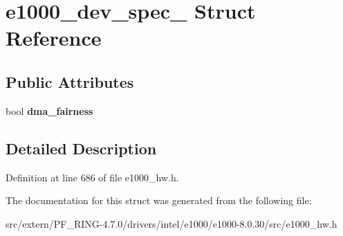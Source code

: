 \hypertarget{structe1000__dev__spec__82542}{
\section{e1000\_\-dev\_\-spec\_ Struct Reference}
\label{structe1000__dev__spec__82542}
}
\subsection*{Public Attributes}
\begin{DoxyCompactItemize}
\item 
\hypertarget{structe1000__dev__spec__82542_ad681841cc28b4e8b96f283f6776d51c7}{
bool {\bfseries dma\_\-fairness}}
\label{structe1000__dev__spec__82542_ad681841cc28b4e8b96f283f6776d51c7}

\end{DoxyCompactItemize}


\subsection{Detailed Description}


Definition at line 686 of file e1000\_\-hw.h.



The documentation for this struct was generated from the following file:\begin{DoxyCompactItemize}
\item 
src/extern/PF\_\-RING-\/4.7.0/drivers/intel/e1000/e1000-\/8.0.30/src/e1000\_\-hw.h\end{DoxyCompactItemize}
